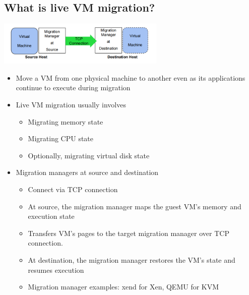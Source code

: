 \documentclass[12pt]{article}
\begin{document}
\subsection{What is live VM migration?}
\includegraphics[width=0.6\textwidth]{LiveVMMigration.png}
\begin{itemize}
    \item Move a VM from one physical machine to another even as its applications continue to execute during migration
    \item Live VM migration usually involves \begin{itemize}
        \item Migrating memory state
        \item Migrating CPU state
        \item Optionally, migrating virtual disk state
    \end{itemize}
    \item Migration managers at source and destination \begin{itemize}
        \item Connect via TCP connection
        \item At source, the migration manager maps the guest VM's memory and execution state
        \item Transfers VM's pages to the target migration manager over TCP connection.
        \item At destination, the migration manager restores the VM's state and resumes execution
        \item Migration manager examples: xend for Xen, QEMU for KVM
    \end{itemize}
\end{itemize}
\end{document}
